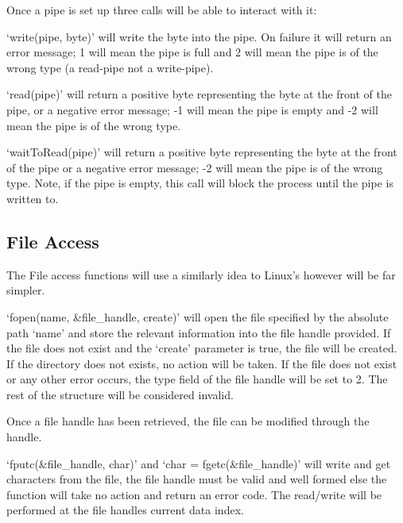 \documentclass[a4paper]{report}
\begin{document}
\vspace{1.5mm}
\noindent
Once a pipe is set up three calls will be able to interact with it:

\vspace{1.5mm}
\noindent
`write(pipe, byte)' will write the byte into the pipe. On failure it will return an error message; 1 will mean the pipe is full and 2 will mean the pipe is of the wrong type (a read-pipe not a write-pipe).

\vspace{1.5mm}
\noindent
`read(pipe)' will return a positive byte representing the byte at the front of the pipe, or a negative error message; -1 will mean the pipe is empty and -2 will mean the pipe is of the wrong type.

\vspace{1.5mm}
\noindent
`waitToRead(pipe)' will return a positive byte representing the byte at the front of the pipe or a negative error message; -2 will mean the pipe is of the wrong type. Note, if the pipe is empty, this call will block the process until the pipe is written to.


\subsection{File Access}

The File access functions will use a similarly idea to Linux's however will be far simpler.

\vspace{1.5mm}
\noindent
`fopen(name, \&file\_handle, create)' will open the file specified by the absolute path `name' and store the relevant information into the file handle provided. If the file does not exist and the `create' parameter is true, the file will be created. If the directory does not exists, no action will be taken. If the file does not exist or any other error occurs, the type field of the file handle will be set to 2. The rest of the structure will be considered invalid.

\vspace{1.5mm}
\noindent
Once a file handle has been retrieved, the file can be modified through the handle.

\vspace{1.5mm}
\noindent
`fputc(\&file\_handle, char)' and `char = fgetc(\&file\_handle)' will write and get characters from the file, the file handle must be valid and well formed else the function will take no action and return an error code. The read/write will be performed at the file handles current data index.
\end{document}
